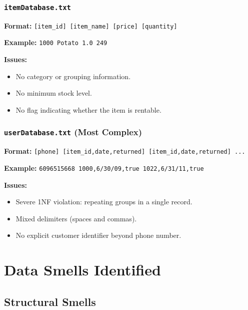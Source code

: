 \subsubsection*{\texttt{itemDatabase.txt}}

\textbf{Format:} \texttt{[item\_id] [item\_name] [price] [quantity]}

\textbf{Example:} \texttt{1000 Potato 1.0 249}

\textbf{Issues:}
\begin{itemize}[leftmargin=1.2cm]
  \item No category or grouping information.
  \item No minimum stock level.
  \item No flag indicating whether the item is rentable.
\end{itemize}

\subsubsection*{\texttt{userDatabase.txt} (Most Complex)}

\textbf{Format:} \texttt{[phone] [item\_id,date,returned] [item\_id,date,returned] ...}

\textbf{Example:} \texttt{6096515668 1000,6/30/09,true 1022,6/31/11,true}

\textbf{Issues:}
\begin{itemize}[leftmargin=1.2cm]
  \item Severe 1NF violation: repeating groups in a single record.
  \item Mixed delimiters (spaces and commas).
  \item No explicit customer identifier beyond phone number.
\end{itemize}

\section{Data Smells Identified}

\subsection{Structural Smells}

